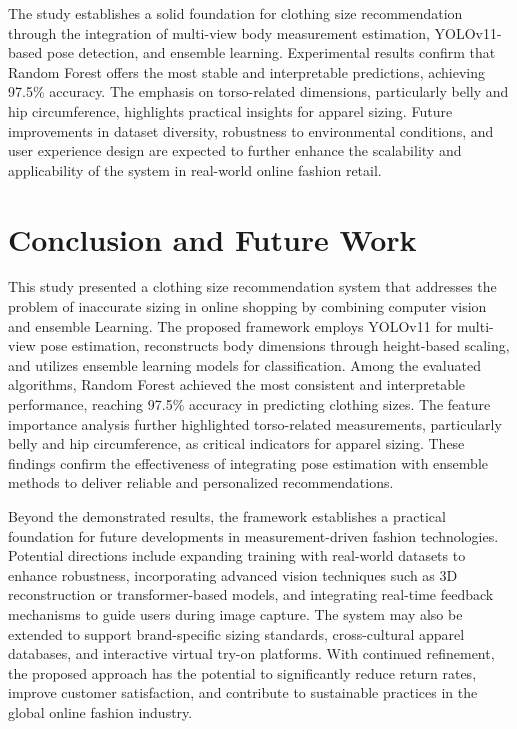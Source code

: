 \documentclass{llncs}
\begin{document}
The study establishes a solid foundation for clothing size recommendation through the integration of multi-view body measurement estimation, YOLOv11-based pose detection, and ensemble learning. 
Experimental results confirm that Random Forest offers the most stable and interpretable predictions, achieving 97.5\% accuracy. 
The emphasis on torso-related dimensions, particularly belly and hip circumference, highlights practical insights for apparel sizing. 
Future improvements in dataset diversity, robustness to environmental conditions, and user experience design are expected to further enhance the scalability and applicability of the system in real-world online fashion retail.


\section{Conclusion and Future Work}

This study presented a clothing size recommendation system that addresses the problem of inaccurate sizing in online shopping by combining computer vision and ensemble Learning. 
The proposed framework employs YOLOv11 for multi-view pose estimation, reconstructs body dimensions through height-based scaling, and utilizes ensemble learning models for classification. 
Among the evaluated algorithms, Random Forest achieved the most consistent and interpretable performance, reaching 97.5\% accuracy in predicting clothing sizes. 
The feature importance analysis further highlighted torso-related measurements, particularly belly and hip circumference, as critical indicators for apparel sizing. 
These findings confirm the effectiveness of integrating pose estimation with ensemble methods to deliver reliable and personalized recommendations.

Beyond the demonstrated results, the framework establishes a practical foundation for future developments in measurement-driven fashion technologies. 
Potential directions include expanding training with real-world datasets to enhance robustness, incorporating advanced vision techniques such as 3D reconstruction or transformer-based models, 
    and integrating real-time feedback mechanisms to guide users during image capture. The system may also be extended to support brand-specific sizing standards, cross-cultural apparel databases, 
    and interactive virtual try-on platforms. 
With continued refinement, the proposed approach has the potential to significantly reduce return rates, improve customer satisfaction, and contribute to sustainable practices in the global online fashion industry.


 

\end{document}
